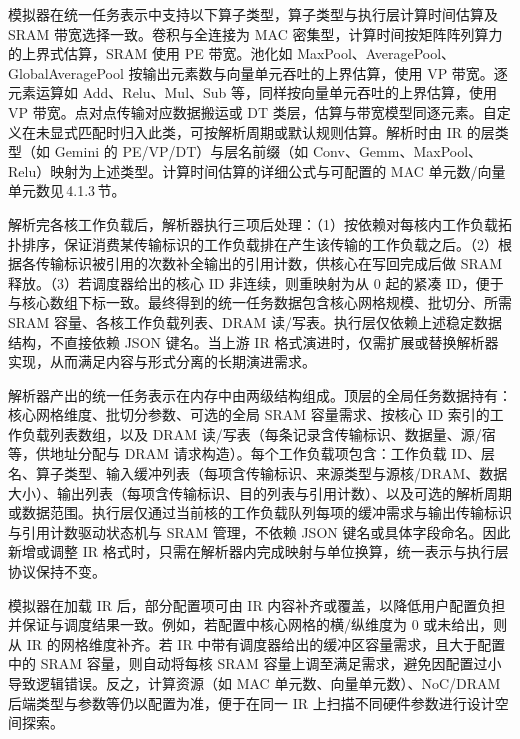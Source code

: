 模拟器在统一任务表示中支持以下算子类型，算子类型与执行层计算时间估算及 SRAM 带宽选择一致。卷积与全连接为 MAC 密集型，计算时间按矩阵阵列算力的上界式估算，SRAM 使用 PE 带宽。池化如 MaxPool、AveragePool、GlobalAveragePool 按输出元素数与向量单元吞吐的上界估算，使用 VP 带宽。逐元素运算如 Add、Relu、Mul、Sub 等，同样按向量单元吞吐的上界估算，使用 VP 带宽。点对点传输对应数据搬运或 DT 类层，估算与带宽模型同逐元素。自定义在未显式匹配时归入此类，可按解析周期或默认规则估算。解析时由 IR 的层类型（如 Gemini 的 PE/VP/DT）与层名前缀（如 Conv、Gemm、MaxPool、Relu）映射为上述类型。计算时间估算的详细公式与可配置的 MAC 单元数/向量单元数见\,4.1.3\,节。


解析完各核工作负载后，解析器执行三项后处理：（1）按依赖对每核内工作负载拓扑排序，保证消费某传输标识的工作负载排在产生该传输的工作负载之后。（2）根据各传输标识被引用的次数补全输出的引用计数，供核心在写回完成后做 SRAM 释放。（3）若调度器给出的核心 ID 非连续，则重映射为从 0 起的紧凑 ID，便于与核心数组下标一致。最终得到的统一任务数据包含核心网格规模、批切分、所需 SRAM 容量、各核工作负载列表、DRAM 读/写表。执行层仅依赖上述稳定数据结构，不直接依赖 JSON 键名。当上游 IR 格式演进时，仅需扩展或替换解析器实现，从而满足内容与形式分离的长期演进需求。

解析器产出的统一任务表示在内存中由两级结构组成。顶层的全局任务数据持有：核心网格维度、批切分参数、可选的全局 SRAM 容量需求、按核心 ID 索引的工作负载列表数组，以及 DRAM 读/写表（每条记录含传输标识、数据量、源/宿等，供地址分配与 DRAM 请求构造）。每个工作负载项包含：工作负载 ID、层名、算子类型、输入缓冲列表（每项含传输标识、来源类型与源核/DRAM、数据大小）、输出列表（每项含传输标识、目的列表与引用计数）、以及可选的解析周期或数据范围。执行层仅通过当前核的工作负载队列每项的缓冲需求与输出传输标识与引用计数驱动状态机与 SRAM 管理，不依赖 JSON 键名或具体字段命名。因此新增或调整 IR 格式时，只需在解析器内完成映射与单位换算，统一表示与执行层协议保持不变。


模拟器在加载 IR 后，部分配置项可由 IR 内容补齐或覆盖，以降低用户配置负担并保证与调度结果一致。例如，若配置中核心网格的横/纵维度为 0 或未给出，则从 IR 的网格维度补齐。若 IR 中带有调度器给出的缓冲区容量需求，且大于配置中的 SRAM 容量，则自动将每核 SRAM 容量上调至满足需求，避免因配置过小导致逻辑错误。反之，计算资源（如 MAC 单元数、向量单元数）、NoC/DRAM 后端类型与参数等仍以配置为准，便于在同一 IR 上扫描不同硬件参数进行设计空间探索。

